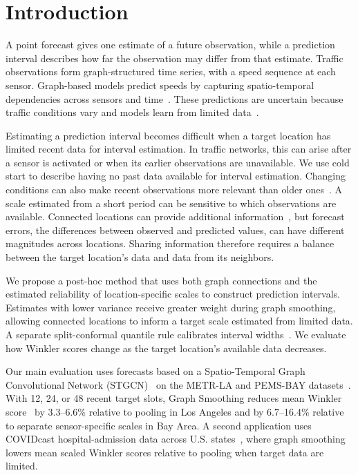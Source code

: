 \documentclass[conference]{IEEEtran}
\begin{document}
\section{Introduction}

A point forecast gives one estimate of a future observation, while a prediction interval describes how far the observation may differ from that estimate. Traffic observations form graph-structured time series, with a speed sequence at each sensor. Graph-based models predict speeds by capturing spatio-temporal dependencies across sensors and time~\cite{yu2018stgcn,li2018dcrnn}. These predictions are uncertain because traffic conditions vary and models learn from limited data~\cite{latifi2025survey,mallick2024uncertainty}.

Estimating a prediction interval becomes difficult when a target location has limited recent data for interval estimation. In traffic networks, this can arise after a sensor is activated or when its earlier observations are unavailable. We use cold start to describe having no past data available for interval estimation. Changing conditions can also make recent observations more relevant than older ones~\cite{gibbs2021adaptive}. A scale estimated from a short period can be sensitive to which observations are available. Connected locations can provide additional information~\cite{cini2025relational}, but forecast errors, the differences between observed and predicted values, can have different magnitudes across locations. Sharing information therefore requires a balance between the target location's data and data from its neighbors.

We propose a post-hoc method that uses both graph connections and the estimated reliability of location-specific scales to construct prediction intervals. Estimates with lower variance receive greater weight during graph smoothing, allowing connected locations to inform a target scale estimated from limited data. A separate split-conformal quantile rule calibrates interval widths~\cite{lei2018distributionfree}. We evaluate how Winkler scores change as the target location's available data decreases.

Our main evaluation uses forecasts based on a Spatio-Temporal Graph Convolutional Network (STGCN)~\cite{yu2018stgcn} on the METR-LA and PEMS-BAY datasets~\cite{li2018dcrnn}. With 12, 24, or 48 recent target slots, Graph Smoothing reduces mean Winkler score~\cite{winkler1972interval} by 3.3--6.6\% relative to pooling in Los Angeles and by 6.7--16.4\% relative to separate sensor-specific scales in Bay Area. A second application uses COVIDcast hospital-admission data across U.S. states~\cite{reinhart2021covidcast}, where graph smoothing lowers mean scaled Winkler scores relative to pooling when target data are limited.
\end{document}

